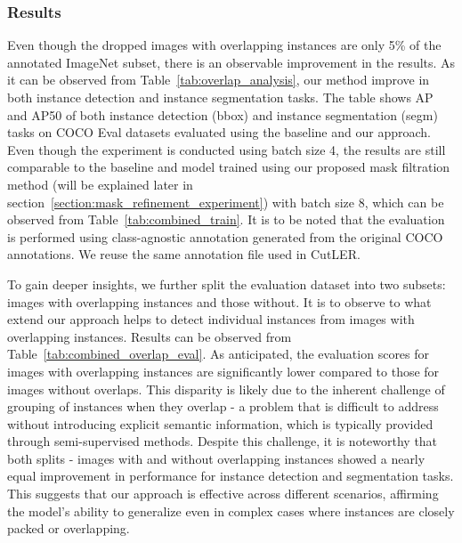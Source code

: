 \subsubsection{Results}
Even though the dropped images with overlapping instances are only 5\% of the annotated ImageNet subset, there is an observable improvement in the results. As it can be observed from Table~\ref{tab:overlap_analysis}, our method improve in both instance detection and instance segmentation tasks. The table shows AP and AP50 of both instance detection (bbox) and instance segmentation (segm) tasks on COCO Eval datasets evaluated using the baseline and our approach. Even though the experiment is conducted using batch size 4, the results are still comparable to the baseline and model trained using our proposed mask filtration method (will be explained later in section~\ref{section:mask_refinement_experiment}) with batch size 8, which can be observed from Table~\ref{tab:combined_train}. It is to be noted that the evaluation is performed using class-agnostic annotation generated from the original COCO annotations. We reuse the same annotation file used in CutLER.

To gain deeper insights, we further split the evaluation dataset into two subsets: images with overlapping instances and those without. It is to observe to what extend our approach helps to detect individual instances from images with overlapping instances. Results can be observed from Table~\ref{tab:combined_overlap_eval}. As anticipated, the evaluation scores for images with overlapping instances are significantly lower compared to those for images without overlaps. This disparity is likely due to the inherent challenge of grouping of instances when they overlap - a problem that is difficult to address without introducing explicit semantic information, which is typically provided through semi-supervised methods. Despite this challenge, it is noteworthy that both splits - images with and without overlapping instances showed a nearly equal improvement in performance for instance detection and segmentation tasks. This suggests that our approach is effective across different scenarios, affirming the model’s ability to generalize even in complex cases where instances are closely packed or overlapping.

